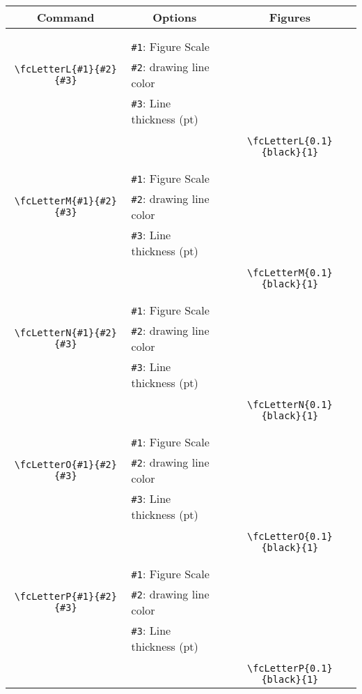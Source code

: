 \documentclass[x11names]{article}
\begin{document}
\begin{table}[H]\centering\begin{tabular}{|c|l|c|}\hline {\bf Command}& \multicolumn{1}{c|}{{\bf Options}} & {\bf Figures}\\  \hline	&&\multirow{5}{*}{\fcLetterL{0.1}{black}{1}}\\	&&\\	&\verb|#1|: Figure Scale &\\	\verb|\fcLetterL{#1}{#2}{#3}|&	\verb|#2|: drawing line color &\\	&\verb|#3|: Line thickness (pt) &\\ &&\\&&	\verb|\fcLetterL{0.1}{black}{1}|\\\hline 	
	&&\multirow{5}{*}{\fcLetterM{0.1}{black}{1}}\\	&&\\	&\verb|#1|: Figure Scale &\\	\verb|\fcLetterM{#1}{#2}{#3}|&	\verb|#2|: drawing line color &\\	&\verb|#3|: Line thickness (pt) &\\ &&\\&&	\verb|\fcLetterM{0.1}{black}{1}|\\\hline 	
	&&\multirow{5}{*}{\fcLetterN{0.1}{black}{1}}\\	&&\\	&\verb|#1|: Figure Scale &\\	\verb|\fcLetterN{#1}{#2}{#3}|&	\verb|#2|: drawing line color &\\	&\verb|#3|: Line thickness (pt) &\\ &&\\&&	\verb|\fcLetterN{0.1}{black}{1}|\\\hline 	
	&&\multirow{5}{*}{\fcLetterO{0.1}{black}{1}}\\	&&\\	&\verb|#1|: Figure Scale &\\	\verb|\fcLetterO{#1}{#2}{#3}|&	\verb|#2|: drawing line color &\\	&\verb|#3|: Line thickness (pt) &\\ &&\\&&	\verb|\fcLetterO{0.1}{black}{1}|\\\hline 	
	&&\multirow{5}{*}{\fcLetterP{0.1}{black}{1}}\\	&&\\	&\verb|#1|: Figure Scale &\\	\verb|\fcLetterP{#1}{#2}{#3}|&	\verb|#2|: drawing line color &\\	&\verb|#3|: Line thickness (pt) &\\ &&\\&&	\verb|\fcLetterP{0.1}{black}{1}|\\\hline 	

\end{tabular}
\end{table}
\end{document}

